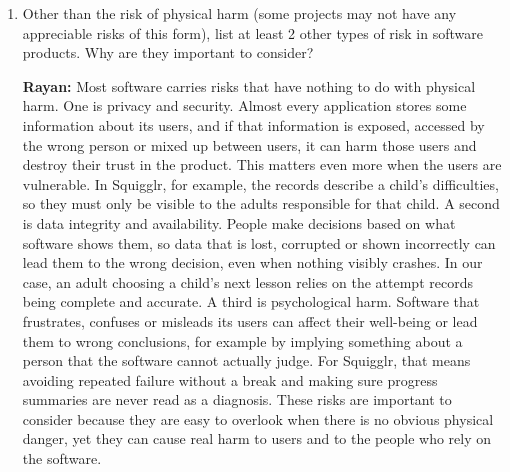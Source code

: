 \documentclass{article}
\begin{document}
\begin{enumerate}
\textbf{Huzaifah:} Three of my risks were ones the team had thought of before
this deliverable. We had already planned that refinement would only tidy the
child's own drawing and that the original could always be restored, which is
where a restore that is not exact (H-MUH-001) and a refinement that changes the
drawing wrongly (H-MUH-002) come from. Losing a drawing that was not saved
(H-MUH-005) was also expected, since the team already knew that attempts could
be lost in a browser.

The other five came up while doing the hazard analysis: records that no longer
show which work was the child's own (H-MUH-003), work saved under the wrong
attempt or child (H-MUH-004), a child who does not accept a refined drawing as
their own (H-MUH-006), records that do not match what actually happened
(H-MUH-007), and summaries that disagree with the records (H-MUH-008). They came
from the FMEA method, which asks four questions of every function: is it not
done, done wrong, done at the wrong time, or done when it should not be?
H-MUH-006 came from also checking the refinement component against the risks of
AI.

\item Other than the risk of physical harm (some projects may not have any
appreciable risks of this form), list at least 2 other types of risk in software
products. Why are they important to consider?

\textbf{Rayan:} Most software carries risks that have nothing to do with
physical harm. One is privacy and security. Almost every application stores some
information about its users, and if that information is exposed, accessed by the
wrong person or mixed up between users, it can harm those users and destroy
their trust in the product. This matters even more when the users are
vulnerable. In Squigglr, for example, the records describe a child's
difficulties, so they must only be visible to the adults responsible for that
child. A second is data integrity and availability. People make decisions based
on what software shows them, so data that is lost, corrupted or shown
incorrectly can lead them to the wrong decision, even when nothing visibly
crashes. In our case, an adult choosing a child's next lesson relies on the
attempt records being complete and accurate. A third is psychological harm.
Software that frustrates, confuses or misleads its users can affect their
well-being or lead them to wrong conclusions, for example by implying something
about a person that the software cannot actually judge. For Squigglr, that means
avoiding repeated failure without a break and making sure progress summaries are
never read as a diagnosis. These risks are important to consider because they
are easy to overlook when there is no obvious physical danger, yet they can
cause real harm to users and to the people who rely on the software.


\end{enumerate}
\end{document}
